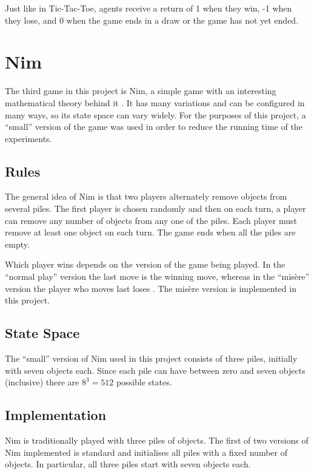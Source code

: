 \documentclass[11pt,a4paper]{report}
\begin{document}
Just like in Tic-Tac-Toe, agents receive a return of 1 when they win, -1 when they lose, and 0 when the game ends in a draw or the game has not yet ended.


\newpage

\section{Nim}
\label{sec:Nim}

The third game in this project is Nim, a simple game with an interesting mathematical theory behind it \cite{nim-rules}. It has many variations and can be configured in many ways, so its state space can vary widely. For the purposes of this project, a ``small'' version of the game was used in order to reduce the running time of the experiments.


\subsection{Rules}

The general idea of Nim \cite{nim-rules} is that two players alternately remove objects from several piles. The first player is chosen randomly and then on each turn, a player can remove any number of objects from any one of the piles. Each player must remove at least one object on each turn. The game ends when all the piles are empty.

Which player wins depends on the version of the game being played. In the ``normal play'' version the last move is the winning move, whereas in the ``mis\`ere'' version the player who moves last loses \cite{winning-ways-math-plays}. The mis\`ere version is implemented in this project.


\subsection{State Space}

The ``small'' version of Nim used in this project  consists of three piles, initially with seven objects each. Since each pile can have between zero and seven objects (inclusive) there are $8^3 = 512$ possible states.


\subsection{Implementation}
\label{sec:NimImplementation}

Nim is traditionally played with three piles of objects. The first of two versions of Nim implemented is standard and initialises all piles with a fixed number of objects. In particular, all three piles start with seven objects each.
\end{document}
